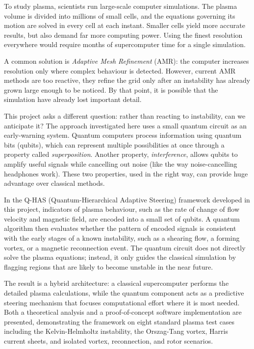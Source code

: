 \documentclass[12pt, a4paper, oneside]{report}
\begin{document}
To study plasma, scientists run large-scale computer simulations. The plasma volume is divided into millions of small cells, and the equations governing its motion are solved in every cell at each instant. Smaller cells yield more accurate results, but also demand far more computing power. Using the finest resolution everywhere would require months of supercomputer time for a single simulation.

A common solution is \textit{Adaptive Mesh Refinement} (AMR): the computer increases resolution only where complex behaviour is detected. However, current AMR methods are too reactive, they refine the grid only after an instability has already grown large enough to be noticed. By that point, it is possible that the simulation have already lost important detail.

This project asks a different question: rather than reacting to instability, can we anticipate it? The approach investigated here uses a small quantum circuit as an early-warning system. Quantum computers process information using quantum bits (qubits), which can represent multiple possibilities at once through a property called \textit{superposition}. Another property, \textit{interference}, allows qubits to amplify useful signals while cancelling out noise (like the way noise-cancelling headphones work). These two properties, used in the right way, can provide huge advantage over classical methods.

In the Q-HAS (Quantum-Hierarchical Adaptive Steering) framework developed in this project, indicators of plasma behaviour, such as the rate of change of flow velocity and magnetic field, are encoded into a small set of qubits. A quantum algorithm then evaluates whether the pattern of encoded signals is consistent with the early stages of a known instability, such as a shearing flow, a forming vortex, or a magnetic reconnection event. The quantum circuit does not directly solve the plasma equations; instead, it only guides the classical simulation by flagging regions that are likely to become unstable in the near future.

The result is a hybrid architecture: a classical supercomputer performs the detailed plasma calculations, while the quantum component acts as a predictive steering mechanism that focuses computational effort where it is most needed. Both a theoretical analysis and a proof-of-concept software implementation are presented, demonstrating the framework on eight standard plasma test cases including the Kelvin-Helmholtz instability, the Orszag-Tang vortex, Harris current sheets, and isolated vortex, reconnection, and rotor scenarios.
\end{document}
